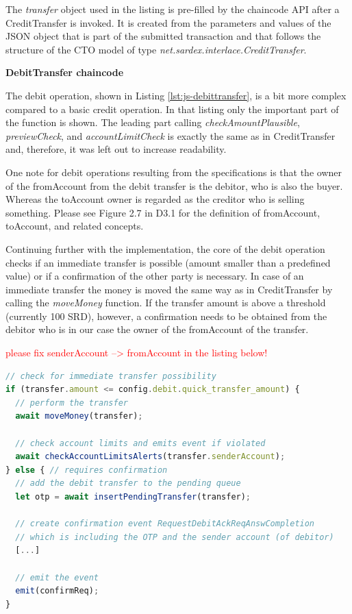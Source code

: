 The \textit{transfer} object used in the listing is pre-filled by the chaincode API after a CreditTransfer is invoked. It is created from the parameters and values of the JSON object that is part of the submitted transaction and that follows the structure of the CTO model of type \textit{net.sardex.interlace.CreditTransfer}.

\textbf{DebitTransfer chaincode}

The debit operation, shown in Listing \ref{lst:js-debittransfer}, is a bit more complex compared to a basic credit operation. In that listing only the important part of the function is shown. The leading part calling \textit{checkAmountPlausible}, \textit{previewCheck}, and \textit{accountLimitCheck} is exactly the same as in CreditTransfer and, therefore, it was left out to increase readability.

One note for debit operations resulting from the specifications is that the owner of the fromAccount from the debit transfer is the debitor, who is also the buyer. Whereas the toAccount owner is regarded as the creditor who is selling something. Please see Figure 2.7 in D3.1 \cite{INTERLACE_D31} for the definition of fromAccount, toAccount, and related concepts.

Continuing further with the implementation, the core of the debit operation checks if an immediate transfer is possible (amount smaller than a predefined value) or if a confirmation of the other party is necessary. In case of an immediate transfer the money is moved the same way as in CreditTransfer by calling the \textit{moveMoney} function. If the transfer amount is above a threshold (currently 100 SRD), however, a confirmation needs to be obtained from the debitor who is in our case the owner of the fromAccount of the transfer.

\textcolor{red}{please fix  senderAccount -->  fromAccount in the listing below!}

\begin{center}
\begin{minipage}{0.8\textwidth}
\small
\begin{lstlisting}[language=javascript,firstnumber=1,caption={\bf\small DebitTransfer JavaScript}, captionpos=b,label=lst:js-debittransfer]
// check for immediate transfer possibility
if (transfer.amount <= config.debit.quick_transfer_amount) {
  // perform the transfer
  await moveMoney(transfer);

  // check account limits and emits event if violated
  await checkAccountLimitsAlerts(transfer.senderAccount);
} else { // requires confirmation
  // add the debit transfer to the pending queue
  let otp = await insertPendingTransfer(transfer);

  // create confirmation event RequestDebitAckReqAnswCompletion
  // which is including the OTP and the sender account (of debitor)
  [...]

  // emit the event
  emit(confirmReq);
}
\end{lstlisting}
\end{minipage}
\end{center}

